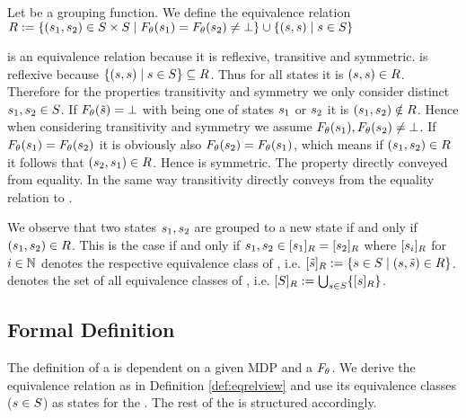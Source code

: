 \documentclass[preview]{standalone}
\begin{document}
\begin{definition}
	Let \grpfct be a grouping function. We define the equivalence relation ${R} :=\{ ({s}_1, {s}_2) \in {S} \times {S} \mid {F_{\ensuremath{{\theta}}}}({s}_1) = {F_{{\theta}}}({s}_2) \neq \bot\} \cup \{({s}, {s})  \mid {s} \in {S}\}$
	
	\label{def:eqrelview}
\end{definition}

\eqrelview is an equivalence relation because it is reflexive, transitive and symmetric. \eqrelview is reflexive because $\{({s}, {s})  \mid {s} \in {S}\} \subseteq {R}$. Thus for all states \state it is $({s}, {s}) \in {R}$. Therefore for the properties transitivity and symmetry we only consider distinct ${s}_1, {s}_2 \in {S}$. If ${F_{{\theta}}}({\tilde{{s}}}) = {\bot}$ with \smstate being one of states ${s}_1$ or ${s}_2$ it is $({s}_1, {s}_2) \notin {R}$. Hence when considering transitivity and symmetry we assume ${F_{{\theta}}}({s}_1), {F_{{\theta}}}({s}_2) \neq {\bot}$. If ${F_{{\theta}}}({s}_1) = {F_{{\theta}}}({s}_2)$ it is obviously also ${F_{{\theta}}}({s}_2) = {F_{{\theta}}}({s}_1)$, which means if $({s}_1, {s}_2) \in {R}$ it follows that $({s}_2, {s}_1) \in {R}$. Hence \eqrelview is symmetric. The property directly conveyed from equality. In the same way transitivity directly conveys from the equality relation to \eqrelview.

We observe that two states ${s}_1, {s}_2$ are grouped to a new state if and only if $({s}_1, {s}_2) \in {R}$. This is the case if and only if ${s}_1, {s}_2 \in {\ensuremath{{[{s}_1]_{{R}}}}} = {{[{s}_2]_{{R}}}}$ where ${{[{s}_i]_{{R}}}}$ for $i \in {\mathbb{N}}$ denotes the respective equivalence class of \eqrelview, i.e. ${{[{\tilde{{s}}}]_{{R}}}} := \{{s} \in {S} \mid ({s},{\tilde{{s}}}) \in {R}\}$. \eqclasssetv denotes the set of all equivalence classes of \eqrelview, i.e. ${{[{{S}}]_{{R}}}} := \bigcup_{{s} \in {S}}\{{{[{s}]_{{R}}}}\}$.

\subsection{Formal Definition}

The definition of a \viewN is dependent on a given MDP and a \grpfctN ${F_{{\theta}}}$. We derive the equivalence relation \eqrelview as in Definition \ref{def:eqrelview} and use its equivalence classes \eqclassv (${s} \in {S}$) as states for the \viewN. The rest of the \chgphN is structured accordingly.
\end{document}
